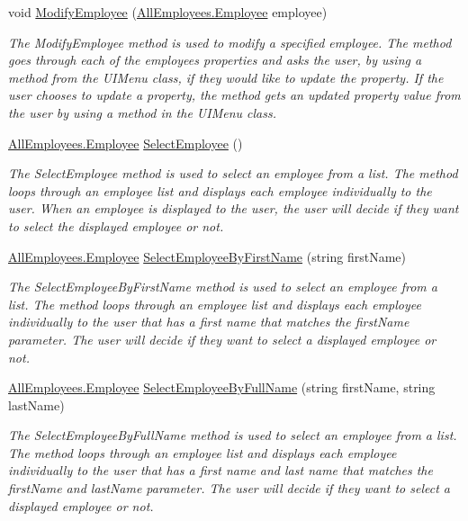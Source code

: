 \begin{DoxyCompactItemize}
void \hyperlink{class_the_company_1_1_container_abe4c2da087834fa62e80fe6457eba47d}{Modify\+Employee} (\hyperlink{class_all_employees_1_1_employee}{All\+Employees.\+Employee} employee)
\begin{DoxyCompactList}\small\item\em The Modify\+Employee method is used to modify a specified employee. The method goes through each of the employee\textquotesingle{}s properties and asks the user, by using a method from the U\+I\+Menu class, if they would like to update the property. If the user chooses to update a property, the method gets an updated property value from the user by using a method in the U\+I\+Menu class. \end{DoxyCompactList}\item 
\hyperlink{class_all_employees_1_1_employee}{All\+Employees.\+Employee} \hyperlink{class_the_company_1_1_container_afab9fa9b66ba08355e405c3bd015b46e}{Select\+Employee} ()
\begin{DoxyCompactList}\small\item\em The Select\+Employee method is used to select an employee from a list. The method loops through an employee list and displays each employee individually to the user. When an employee is displayed to the user, the user will decide if they want to select the displayed employee or not. \end{DoxyCompactList}\item 
\hyperlink{class_all_employees_1_1_employee}{All\+Employees.\+Employee} \hyperlink{class_the_company_1_1_container_aaea10d0d9e57806faf7d8615944d8958}{Select\+Employee\+By\+First\+Name} (string first\+Name)
\begin{DoxyCompactList}\small\item\em The Select\+Employee\+By\+First\+Name method is used to select an employee from a list. The method loops through an employee list and displays each employee individually to the user that has a first name that matches the first\+Name parameter. The user will decide if they want to select a displayed employee or not. \end{DoxyCompactList}\item 
\hyperlink{class_all_employees_1_1_employee}{All\+Employees.\+Employee} \hyperlink{class_the_company_1_1_container_a35868a52012d36cf7312691e0bcc258c}{Select\+Employee\+By\+Full\+Name} (string first\+Name, string last\+Name)
\begin{DoxyCompactList}\small\item\em The Select\+Employee\+By\+Full\+Name method is used to select an employee from a list. The method loops through an employee list and displays each employee individually to the user that has a first name and last name that matches the first\+Name and last\+Name parameter. The user will decide if they want to select a displayed employee or not. \end{DoxyCompactList}\item 

\end{DoxyCompactItemize}
